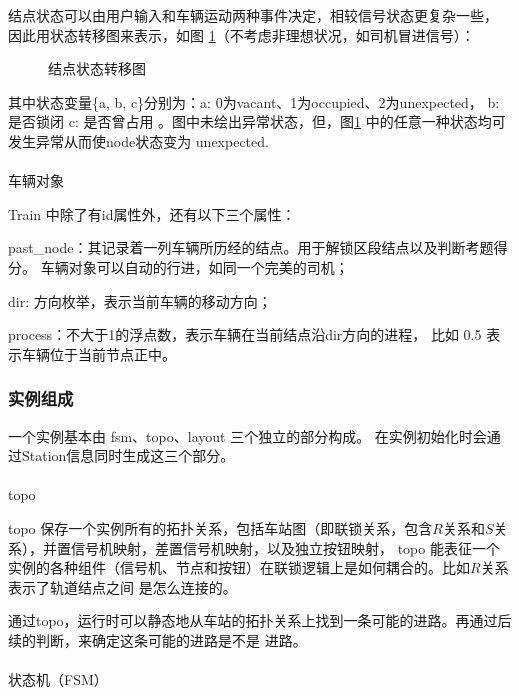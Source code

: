 结点状态可以由用户输入和车辆运动两种事件决定，相较信号状态更复杂一些，
因此用状态转移图来表示，如图 \ref{node_fsm}（不考虑非理想状况，如司机冒进信号）：

\begin{figure}[htpb!]
    \centering
    
    \caption{\label{node_fsm}结点状态转移图}
\end{figure}

其中状态变量\{a, b, c\}分别为：a: 0为vacant、1为occupied、2为unexpected， b: 是否锁闭 c: 是否曾占用
。图中未绘出异常状态，但，图\ref{node_fsm} 中的任意一种状态均可发生异常从而使node状态变为 unexpected.

\paragraph{}车辆对象

Train 中除了有id属性外，还有以下三个属性：

past\_node：其记录着一列车辆所历经的结点。用于解锁区段结点以及判断考题得分。
车辆对象可以自动的行进，如同一个完美的司机；

dir: 方向枚举，表示当前车辆的移动方向；

process：不大于1的浮点数，表示车辆在当前结点沿dir方向的进程，
比如 0.5 表示车辆位于当前节点正中。

\subsubsection{实例组成}
一个实例基本由 fsm、topo、layout 三个独立的部分构成。
在实例初始化时会通过Station信息同时生成这三个部分。

\paragraph{}topo

topo 保存一个实例所有的拓扑关系，包括车站图（即联锁关系，包含$R$关系和$S$关系），并置信号机映射，差置信号机映射，以及独立按钮映射，
topo 能表征一个实例的各种组件（信号机、节点和按钮）在联锁逻辑上是如何耦合的。比如$R$关系表示了轨道结点之间
是怎么连接的\cite{石擎宇2014基于图论的联锁程序的研究与设计}。

通过topo，运行时可以静态地从车站的拓扑关系上找到一条可能的进路。再通过后续的判断，来确定这条可能的进路是不是
进路。

\paragraph{}状态机（FSM）

